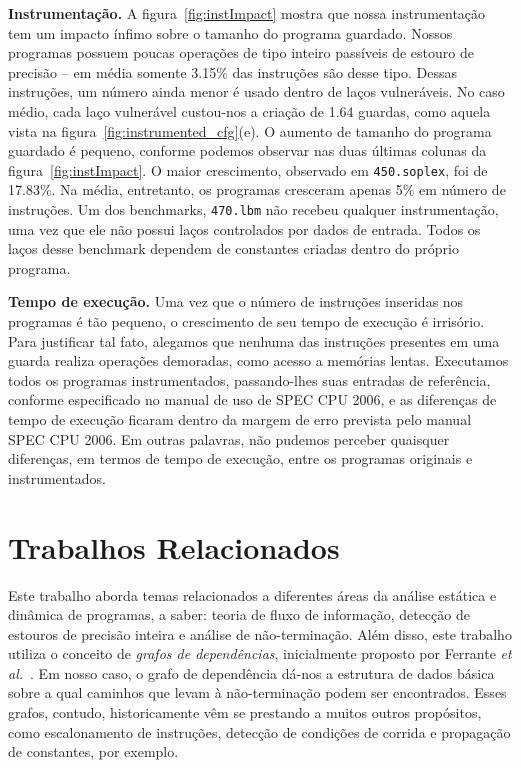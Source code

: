 \documentclass{llncs}
\begin{document}
\noindent
\textbf{Instrumentação. }
A figura~\ref{fig:instImpact} mostra que nossa instrumentação tem um
impacto ínfimo sobre o tamanho do programa guardado.
Nossos programas possuem poucas operações de tipo inteiro passíveis de estouro
de precisão -- em média somente 3.15\% das instruções são desse tipo.
Dessas instruções, um número ainda menor é usado dentro de laços vulneráveis.
No caso médio, cada laço vulnerável custou-nos a criação de 1.64 guardas, como
aquela vista na figura~\ref{fig:instrumented_cfg}(e).
O aumento de tamanho do programa guardado é pequeno, conforme podemos
observar nas duas últimas colunas da figura~\ref{fig:instImpact}.
O maior crescimento, observado em \texttt{450.soplex}, foi de 17.83\%.
Na média, entretanto, os programas cresceram apenas 5\% em número de
instruções.
Um dos benchmarks, \texttt{470.lbm} não recebeu qualquer instrumentação,
uma vez que ele não possui laços controlados por dados de entrada.
Todos os laços desse benchmark dependem de constantes criadas dentro do próprio
programa.

\noindent
\textbf{Tempo de execução. }
Uma vez que o número de instruções inseridas nos programas é tão pequeno, o
crescimento de seu tempo de execução é irrisório.
Para justificar tal fato, alegamos que nenhuma das instruções presentes em
uma guarda realiza operações demoradas, como acesso a memórias lentas.
Executamos todos os programas instrumentados, passando-lhes suas entradas de
referência, conforme especificado no manual de uso de SPEC CPU 2006, e as
diferenças de tempo de execução ficaram dentro da margem de erro
prevista pelo manual SPEC CPU 2006.
Em outras palavras, não pudemos perceber quaisquer diferenças, em termos de
tempo de execução, entre os programas originais e instrumentados.



\section{Trabalhos Relacionados}
\label{sec:rel}

Este trabalho aborda temas relacionados a diferentes áreas da análise estática
e dinâmica de programas, a saber: teoria de fluxo de informação, detecção de
estouros de precisão inteira e análise de não-terminação.
Além disso, este trabalho utiliza o conceito de {\em grafos de dependências},
inicialmente proposto por Ferrante {\em et al.}~\cite{Ferrante87}.
Em nosso caso, o grafo de dependência dá-nos a estrutura de dados básica sobre
a qual caminhos que levam à não-terminação podem ser encontrados.
Esses grafos, contudo, historicamente vêm se prestando a muitos outros
propósitos, como escalonamento de instruções, detecção de condições de corrida e
propagação de constantes, por exemplo.
\end{document}

